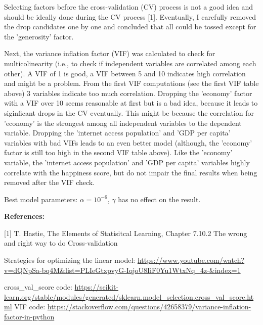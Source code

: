 \documentclass[11pt]{article}
\begin{document}
Selecting factors before the cross-validation (CV) process is not a good
idea and should be ideally done during the CV process {[}1{]}.
Eventually, I carefully removed the drop candidates one by one and
concluded that all could be tossed except for the 'generosity' factor.

Next, the variance inflation factor (VIF) was calculated to check for
multicolinearity (i.e., to check if independent variables are correlated
among each other). A VIF of 1 is good, a VIF between 5 and 10 indicates
high correlation and might be a problem. From the first VIF computations
(see the first VIF table above) 3 variables indicate too much
correlation.\newline
Dropping the 'economy' factor with a VIF over 10 seems reasonable at
first but is a bad idea, because it leads to siginficant drops in the CV
eventually. This might be because the correlation for 'economy' is the
strongest among all independent variables to the dependent variable.
Dropping the 'internet access population' and 'GDP per capita' variables
with bad VIFs leads to an even better model (although, the 'economy'
factor is still too high in the second VIF table above). Like the
'economy' variable, the 'internet access population' and 'GDP per
capita' variables highly correlate with the happiness score, but do not
impair the final results when being removed after the VIF check.\newline

Best model parameters: \(\alpha = 10^{-6}\), \(\gamma\) has no effect on
the result.\newline

\textbf{References:}\newline

{[}1{]} T. Hastie, The Elements of Statisitcal Learning, Chapter 7.10.2
The wrong and right way to do Cross-validation\newline

Strategies for optimizing the linear model:\newline
\url{https://www.youtube.com/watch?v=dQNpSa-bq4M&list=PLIeGtxpvyG-IqjoU8IiF0Yu1WtxNq_4z-&index=1}\newline

cross\_val\_score code:\newline
\url{https://scikit-learn.org/stable/modules/generated/sklearn.model_selection.cross_val_score.html}\newline
VIF code:\newline
\url{https://stackoverflow.com/questions/42658379/variance-inflation-factor-in-python}\newline
\end{document}
